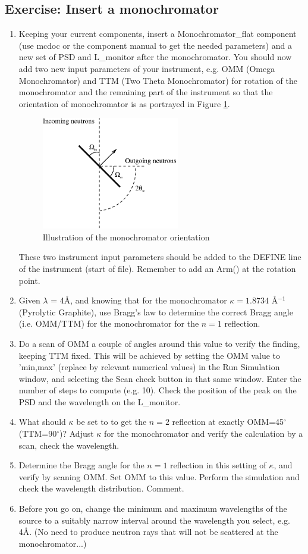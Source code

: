 \subsection{Exercise: Insert a monochromator}
\begin{enumerate}
\item{Keeping your current components, insert a Monochromator\_flat
component (use mcdoc or the component manual to get the needed parameters) and a
new set of PSD and L\_monitor after the monochromator. You should now add
two new input parameters of your instrument, e.g. OMM (Omega
Monochromator) and TTM (Two Theta Monochromator)
for rotation of the monochromator and the remaining part of the 
instrument so that the orientation of
monochromator is as portrayed in Figure \ref{mono.eps}.
\begin{figure}[htb!]
\begin{center}
\includegraphics[width=6cm]{pics/mono.eps}
\end{center}
\caption{Illustration of the monochromator orientation}
\label{mono.eps}
\end{figure}
These two instrument input parameters should be added to the DEFINE line of the instrument (start of file). Remember to add an Arm() at the rotation point. }
\item{Given $\lambda$ = 4\AA, and knowing that for the
monochromator $\kappa=1.8734$ \AA$^{-1}$ (Pyrolytic Graphite), use Bragg's law to determine the 
correct Bragg angle (i.e. OMM/TTM) for the monochromator for the $n=1$ reflection. }
\item{Do a scan of OMM a couple of angles around this value to verify
    the finding, keeping TTM fixed. This will be achieved by setting the OMM value to 'min,max' (replace by relevant numerical values) in the Run Simulation window, and selecting the Scan check button in that same window. Enter the number of steps to compute (e.g. 10). Check the position of the peak on
    the PSD and the wavelength on the L\_monitor. }
\item{What should $\kappa$ be set to to get the $n=2$ reflection at exactly
    OMM=45$^\circ$ (TTM=90$^\circ$)?
Adjust $\kappa$ for the monochromator and verify the calculation by a
scan, check the wavelength. }
\item{Determine the Bragg angle for the $n=1$ reflection in this
setting of $\kappa$, and verify by scaning OMM. Set OMM to this
value. Perform the simulation and check the wavelength distribution.
Comment.}
\item{Before you go on, change the minimum and maximum wavelengths of
    the source to a suitably narrow interval around the wavelength you select,
    e.g. 4\AA. (No need to
    produce neutron rays that will not be scattered at the monochromator...)}
\end{enumerate}
